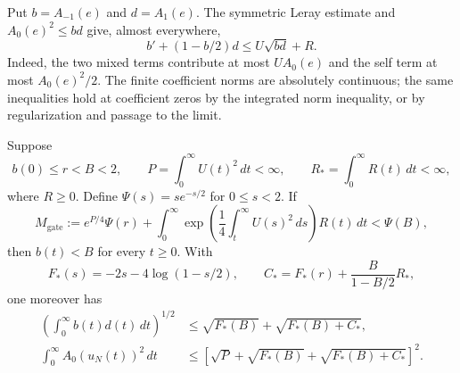 Put $b=A_{-1}(e)$ and $d=A_1(e)$. The symmetric Leray estimate and
$A_0(e)^2\le bd$ give, almost everywhere,
\begin{equation}
 b'+(1-b/2)d\le U\sqrt{bd}+R.
 \label{ext:error}
\end{equation}
Indeed, the two mixed terms contribute at most $UA_0(e)$ and the self term
at most $A_0(e)^2/2$. The finite coefficient norms are absolutely continuous;
the same inequalities hold at coefficient zeros by the integrated norm
inequality, or by regularization and passage to the limit.

\begin{lemma}\label{ext:historylemma}
Suppose
\[
 b(0)\le r<B<2,\qquad
 P=\int_0^\infty U(t)^2\,dt<\infty,\qquad
 R_*=\int_0^\infty R(t)\,dt<\infty,
\]
where $R\ge0$. Define $\Psi(s)=se^{-s/2}$ for $0\le s<2$.
If
\begin{equation}
 M_{\mathrm{gate}}:=e^{P/4}\Psi(r)+
 \int_0^\infty
  \exp\!\left(\frac14\int_t^\infty U(s)^2\,ds\right)R(t)\,dt
 <\Psi(B),
 \label{ext:gate}
\end{equation}
then $b(t)<B$ for every $t\ge0$. With
\begin{equation}
 F_*(s)=-2s-4\log(1-s/2),\qquad
 C_*=F_*(r)+\frac{B}{1-B/2}R_*,
 \label{ext:F}
\end{equation}
one moreover has
\begin{align}
 \left(\int_0^\infty b(t)d(t)\,dt\right)^{1/2}
 &\le\sqrt{F_*(B)}+\sqrt{F_*(B)+C_*},
 \label{ext:errorbudget}\\
 \int_0^\infty A_0(u_N(t))^2\,dt
 &\le
 \left[\sqrt P+\sqrt{F_*(B)}+\sqrt{F_*(B)+C_*}\right]^2.
 \label{ext:referencebudget}
\end{align}
\end{lemma}

